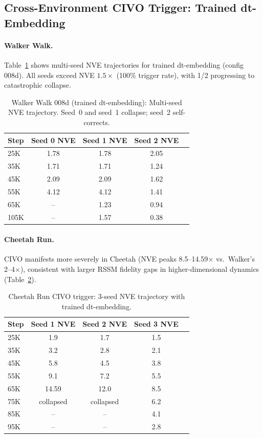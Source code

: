 \documentclass[10pt,letterpaper]{article}
\begin{document}
\subsection{Cross-Environment CIVO Trigger: Trained dt-Embedding}
\label{sec:civo_trigger}

\paragraph{Walker Walk.}
Table~\ref{tab:walker_008d} shows multi-seed NVE trajectories for trained dt-embedding (config 008d).
All seeds exceed NVE $1.5\times$ (100\% trigger rate), with 1/2 progressing to catastrophic collapse.

\begin{table}[h]
\centering
\caption{Walker Walk 008d (trained dt-embedding): Multi-seed NVE trajectory. Seed~0 and seed~1 collapse; seed~2 self-corrects.}
\label{tab:walker_008d}
\begin{tabular}{lcccc}
\toprule
Step & Seed 0 NVE & Seed 1 NVE & Seed 2 NVE \\
\midrule
25K & 1.78 & 1.78 & 2.05 \\
35K & 1.71 & 1.71 & 1.24 \\
45K & 2.09 & 2.09 & 1.62 \\
55K & 4.12 & 4.12 & 1.41 \\
65K & -- & 1.23 & 0.94 \\
105K & -- & 1.57 & 0.38 \\
\bottomrule
\end{tabular}
\end{table}

\paragraph{Cheetah Run.}
CIVO manifests more severely in Cheetah (NVE peaks 8.5--14.59$\times$ vs.\ Walker's 2--4$\times$), consistent with larger RSSM fidelity gaps in higher-dimensional dynamics (Table~\ref{tab:cheetah_civo}).

\begin{table}[h]
\centering
\caption{Cheetah Run CIVO trigger: 3-seed NVE trajectory with trained dt-embedding.}
\label{tab:cheetah_civo}
\begin{tabular}{lcccc}
\toprule
Step & Seed 1 NVE & Seed 2 NVE & Seed 3 NVE \\
\midrule
25K & 1.9 & 1.7 & 1.5 \\
35K & 3.2 & 2.8 & 2.1 \\
45K & 5.8 & 4.5 & 3.8 \\
55K & 9.1 & 7.2 & 5.5 \\
65K & 14.59 & 12.0 & 8.5 \\
75K & collapsed & collapsed & 6.2 \\
85K & -- & -- & 4.1 \\
95K & -- & -- & 2.8 \\
\bottomrule
\end{tabular}
\end{table}
\end{document}
